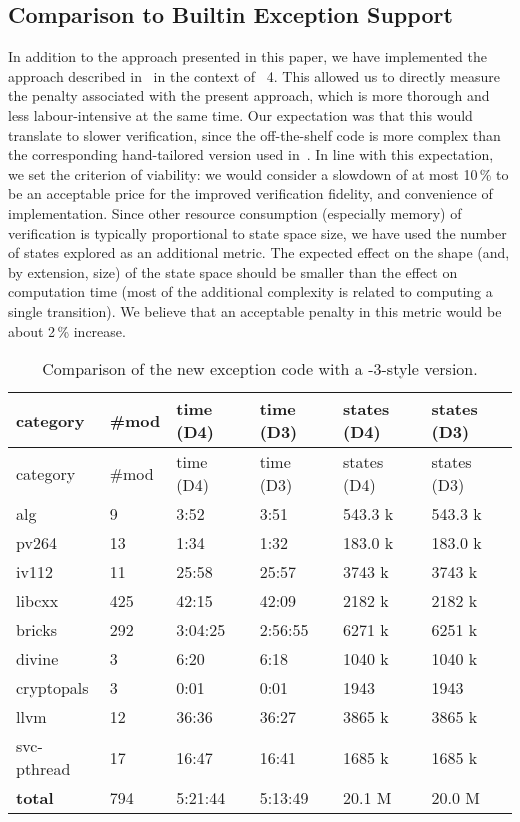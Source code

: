 \subsection{Comparison to Builtin Exception Support}\label{sec:cmpD3}

In addition to the approach presented in this paper, we have implemented
the approach described in~\cite{rockai16:model.checkin} in the context
of \divine{}~4. This allowed us to directly measure the penalty associated
with the present approach, which is more thorough and less
labour-intensive at the same time. Our expectation was that this would
translate to slower verification, since the off-the-shelf code is more
complex than the corresponding hand-tailored version used
in~\cite{rockai16:model.checkin}. In line with this expectation, we set
the criterion of viability: we would consider a slowdown of at most
10\,\% to be an acceptable price for the improved verification fidelity,
and convenience of implementation. Since other resource consumption
(especially memory) of verification is typically proportional to state
space size, we have used the number of states explored as an additional
metric. The expected effect on the shape (and, by extension, size) of
the state space should be smaller than the effect on computation time
(most of the additional complexity is related to computing a single
transition). We believe that an acceptable penalty in this metric would
be about 2\,\% increase.

\begin{table}[tp]
\caption{\label{tbl:D4D3}Comparison of the new exception code with a
\divine{}-3-style version. }
\begin{tabularx}{\textwidth}{llllll}
\toprule
category & \#mod & time (D4) & time (D3) & states (D4) & states
(D3)\tabularnewline
\midrule
\toprule
category & \#mod & time (D4) & time (D3) & states (D4) & states
(D3)\tabularnewline
\midrule
alg & 9 & 3:52 & 3:51 & 543.3 k & 543.3 k\tabularnewline
pv264 & 13 & 1:34 & 1:32 & 183.0 k & 183.0 k\tabularnewline
iv112 & 11 & 25:58 & 25:57 & 3743 k & 3743 k\tabularnewline
libcxx & 425 & 42:15 & 42:09 & 2182 k & 2182 k\tabularnewline
bricks & 292 & 3:04:25 & 2:56:55 & 6271 k & 6251 k\tabularnewline
divine & 3 & 6:20 & 6:18 & 1040 k & 1040 k\tabularnewline
cryptopals & 3 & 0:01 & 0:01 & 1943 & 1943\tabularnewline
llvm & 12 & 36:36 & 36:27 & 3865 k & 3865 k\tabularnewline
svc-pthread & 17 & 16:47 & 16:41 & 1685 k & 1685 k\tabularnewline
\textbf{total} & 794 & 5:21:44 & 5:13:49 & 20.1 M & 20.0
M\tabularnewline
\bottomrule
\end{tabularx}
\end{table}

